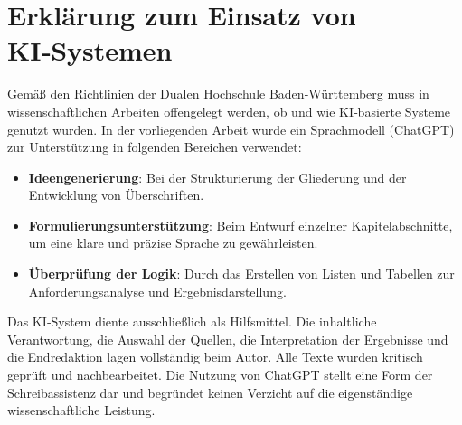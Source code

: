 \section{Erklärung zum Einsatz von KI‑Systemen}

Gemäß den Richtlinien der Dualen Hochschule Baden‑Württemberg muss in wissenschaftlichen Arbeiten offengelegt werden, ob und wie KI‑basierte Systeme genutzt wurden. In der vorliegenden Arbeit wurde ein Sprachmodell (ChatGPT) zur Unterstützung in folgenden Bereichen verwendet:


\begin{itemize}[leftmargin=1.2cm]
  \item \textbf{Ideengenerierung}: Bei der Strukturierung der Gliederung und der Entwicklung von Überschriften.
  \item \textbf{Formulierungsunterstützung}: Beim Entwurf einzelner Kapitelabschnitte, um eine klare und präzise Sprache zu gewährleisten.
  \item \textbf{Überprüfung der Logik}: Durch das Erstellen von Listen und Tabellen zur Anforderungsanalyse und Ergebnisdarstellung.
\end{itemize}

Das KI‑System diente ausschließlich als Hilfsmittel. Die inhaltliche Verantwortung, die Auswahl der Quellen, die Interpretation der Ergebnisse und die Endredaktion lagen vollständig beim Autor. Alle Texte wurden kritisch geprüft und nachbearbeitet. Die Nutzung von ChatGPT stellt eine Form der Schreibassistenz dar und begründet keinen Verzicht auf die eigenständige wissenschaftliche Leistung.
